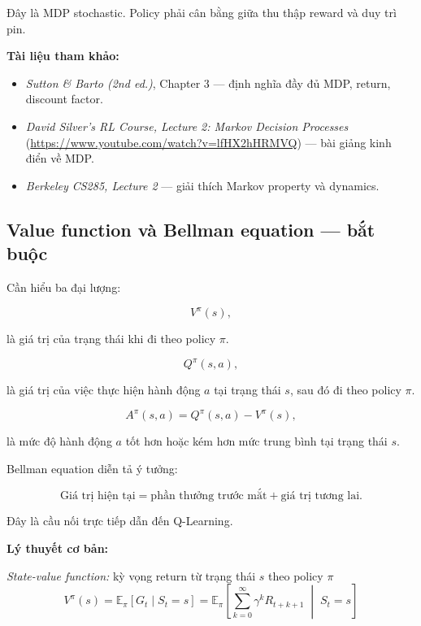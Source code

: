 \documentclass[12pt,a4paper]{article}
\begin{document}
Đây là MDP stochastic. Policy phải cân bằng giữa thu thập reward và duy trì pin.

\textbf{Tài liệu tham khảo:}
\begin{itemize}[leftmargin=1.5em]
    \item \textit{Sutton \& Barto (2nd ed.)}, Chapter 3 --- định nghĩa đầy đủ MDP, return, discount factor.
    \item \textit{David Silver's RL Course, Lecture 2: Markov Decision Processes} (\url{https://www.youtube.com/watch?v=lfHX2hHRMVQ}) --- bài giảng kinh điển về MDP.
    \item \textit{Berkeley CS285, Lecture 2} --- giải thích Markov property và dynamics.
\end{itemize}

\subsection{Value function và Bellman equation --- bắt buộc}

Cần hiểu ba đại lượng:

\begin{equation}
V^\pi(s),
\end{equation}

là giá trị của trạng thái khi đi theo policy $\pi$.

\begin{equation}
Q^\pi(s,a),
\end{equation}

là giá trị của việc thực hiện hành động $a$ tại trạng thái $s$, sau đó đi theo policy $\pi$.

\begin{equation}
A^\pi(s,a)=Q^\pi(s,a)-V^\pi(s),
\end{equation}

là mức độ hành động $a$ tốt hơn hoặc kém hơn mức trung bình tại trạng thái $s$.

Bellman equation diễn tả ý tưởng:

\begin{equation}
\text{Giá trị hiện tại}
=
\text{phần thưởng trước mắt}
+
\text{giá trị tương lai}.
\end{equation}

Đây là cầu nối trực tiếp dẫn đến Q-Learning.

\textbf{Lý thuyết cơ bản:}

\textit{State-value function:} kỳ vọng return từ trạng thái $s$ theo policy $\pi$
\begin{equation}
V^\pi(s) = \mathbb{E}_\pi[G_t \mid S_t=s] = \mathbb{E}_\pi\left[\sum_{k=0}^{\infty} \gamma^k R_{t+k+1} \;\middle|\; S_t=s\right]
\end{equation}
\end{document}
